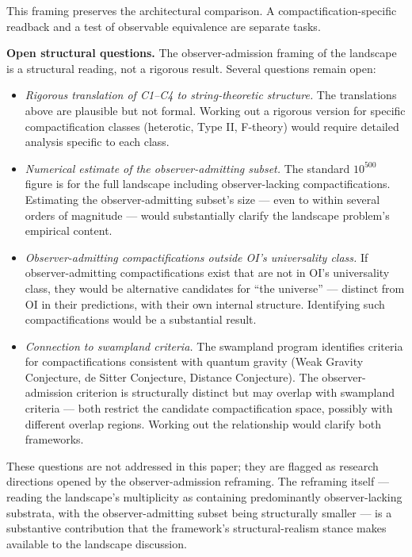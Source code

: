 \documentclass[
]{article}
\begin{document}
This framing preserves the architectural comparison. A
compactification-specific readback and a test of observable equivalence
are separate tasks.

\textbf{Open structural questions.} The observer-admission framing of
the landscape is a structural reading, not a rigorous result. Several
questions remain open:

\begin{itemize}
\item
  \emph{Rigorous translation of C1--C4 to string-theoretic structure.}
  The translations above are plausible but not formal. Working out a
  rigorous version for specific compactification classes (heterotic,
  Type II, F-theory) would require detailed analysis specific to each
  class.
\item
  \emph{Numerical estimate of the observer-admitting subset.} The
  standard \(10^{500}\) figure is for the full landscape including
  observer-lacking compactifications. Estimating the observer-admitting
  subset's size --- even to within several orders of magnitude --- would
  substantially clarify the landscape problem's empirical content.
\item
  \emph{Observer-admitting compactifications outside OI's universality
  class.} If observer-admitting compactifications exist that are not in
  OI's universality class, they would be alternative candidates for
  ``the universe'' --- distinct from OI in their predictions, with their
  own internal structure. Identifying such compactifications would be a
  substantial result.
\item
  \emph{Connection to swampland criteria.} The swampland program
  identifies criteria for compactifications consistent with quantum
  gravity (Weak Gravity Conjecture, de Sitter Conjecture, Distance
  Conjecture). The observer-admission criterion is structurally distinct
  but may overlap with swampland criteria --- both restrict the
  candidate compactification space, possibly with different overlap
  regions. Working out the relationship would clarify both frameworks.
\end{itemize}

These questions are not addressed in this paper; they are flagged as
research directions opened by the observer-admission reframing. The
reframing itself --- reading the landscape's multiplicity as containing
predominantly observer-lacking substrata, with the observer-admitting
subset being structurally smaller --- is a substantive contribution that
the framework's structural-realism stance makes available to the
landscape discussion.
\end{document}
